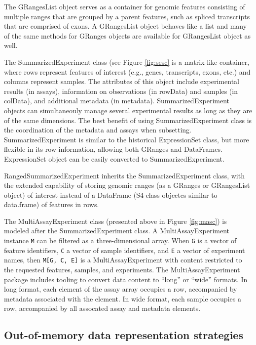 \documentclass[graybox]{svmult}
\begin{document}
The GRangesList object serves as a container for genomic features consisting of multiple
ranges that are grouped by a parent features, such as spliced transcripts that are
comprised of exons. A GRangesList object behaves like a list and many of the same
methods for GRanges objects are available for GRangesList object as well.

The SummarizedExperiment class (see Figure \ref{fig:sesc} is a matrix-like container, where rows represent features of interest (e.g., genes, transcripts, exons, etc.) and columns represent samples. The attributes of this object include experimental results (in assays), information on observations (in rowData) and samples (in colData), and additional metadata (in metadata). SummarizedExperiment objects can simultaneouly manage several experimental results as long as they are of the same dimensions. The best benefit of using SummarizedExperiment class is the coordination of the metadata and assays when subsetting. SummarizedExperiment is similar to the historical ExpressionSet class, but more flexible in its row information, allowing both GRanges and DataFrames. ExpressionSet object can be easily converted to SummarizedExperiment.

RangedSummarizedExperiment inherits the SummarizedExperiment class, with the extended capability of storing genomic ranges (as a GRanges or GRangesList object) of interest instead of a DataFrame (S4-class objectcs similar to data.frame) of features in rows.

The MultiAssayExperiment class (presented above in
Figure \ref{fig:masc}) is modeled after the SummarizedExperiment class.
A MultiAssayExperiment instance \texttt{M} can be
filtered as a three-dimensional array.
When \texttt{G} is a vector of feature identifiers,
\texttt{C} a vector of sample identifiers, and \texttt{E} a
vector of experiment names, then \texttt{M{[}G, C, E{]}} is
a MultiAssayExperiment with content restricted to the
requested features, samples, and experiments. The MultiAssayExperiment
package includes tooling to convert data content to ``long'' or
``wide'' formats. In long format, each element of the assay array occupies
a row, accompanied by metadata associated with the element.
In wide format, each sample occupies a row, accompanied by all
assocated assay and metadata elements.

\subsection{Out-of-memory data representation strategies}\label{out-of-memory-data-representation-strategies}
\end{document}
